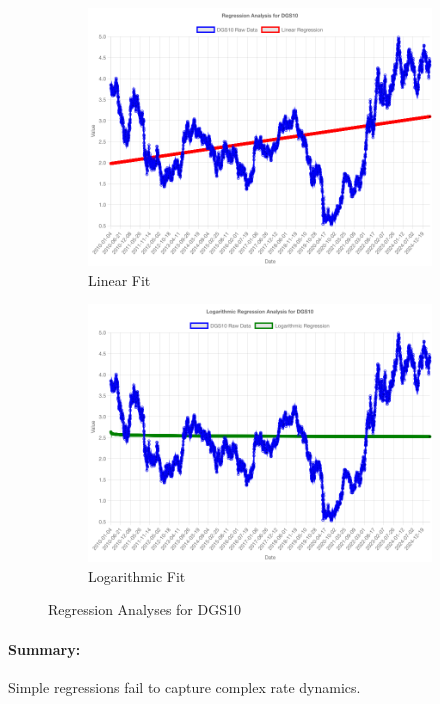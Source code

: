 \documentclass[11pt,a4paper]{article}
\begin{document}
\begin{figure}[htbp]
  \centering
  \begin{subfigure}[b]{0.48\textwidth}
    \includegraphics[width=\textwidth]{backend/analyses/DGS10_analysis.png}
    \caption{Linear Fit}
  \end{subfigure}
  \hfill
  \begin{subfigure}[b]{0.48\textwidth}
    \includegraphics[width=\textwidth]{backend/analyses/DGS10_log_analysis.png}
    \caption{Logarithmic Fit}
  \end{subfigure}
  \caption{Regression Analyses for DGS10}
\end{figure}

\paragraph{Summary:}
Simple regressions fail to capture complex rate dynamics.
\end{document}
